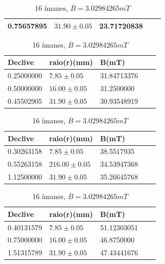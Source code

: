 \documentclass[11pt]{report}
\begin{document}
\begin{table}[!htb]
\begin{minipage}{.5\linewidth}
\begin{tabular}{lllll}
	0.75657895& $31.90\pm 0.05$   & 23.71720838   \\ \hline
				\end{tabular}
		\end{minipage}%
		\vspace{\belowdisplayskip}
		\vspace{\abovedisplayskip}
		\begin{minipage}{.5\linewidth}
			\centering
				\caption{10 ímanes, $\overline{B} = 3.13442077 mT$}
				\begin{tabular}{lllll}
	\hline
	Declive        & raio(r)(mm)            & B(mT)           \\ \hline
	0.25000000 & $7.85\pm 0.05$                 & 31.84713376  \\
	0.50000000 & $16.00\pm 0.05$                & 31.2500000\\
	0.45502905 & $31.90\pm 0.05$  & 30.93548919   \\ \hline
				\end{tabular}
		\end{minipage}
		\vspace{\belowdisplayskip}
		\vspace{\abovedisplayskip}
		\begin{minipage}{.5\linewidth}
			\centering
			\caption{12 ímanes, $\overline{B} = 3.0099368 mT$}
				\begin{tabular}{lllll}
	\hline
	Declive        & raio(r)(mm)     & B(mT)          \\ \hline
	0.30263158 & $7.85\pm 0.05$  &38.5517935  \\
	0.55263158& $216.00\pm 0.05$      &34.53947368 \\
	1.12500000& $31.90\pm 0.05$    &35.26645768   \\ \hline
				\end{tabular}
		\end{minipage}%
		\vspace{\belowdisplayskip}
		\vspace{\abovedisplayskip}
		\begin{minipage}{.5\linewidth}
			\centering
			\caption{16 ímanes, $\overline{B} = 3.02984265 mT$}
				\begin{tabular}{lllll}
	\hline
	Declive        & raio(r)(mm)            & B(mT)           \\ \hline
	0.40131579 &$7.85\pm 0.05$      & 51.12303051  \\
	0.75000000 &$16.00\pm 0.05$   & 46.8750000\\
	1.51315789 &$31.90\pm 0.05$     & 47.43441676   \\ \hline
				\end{tabular}
		\end{minipage}
		\vspace{\belowdisplayskip}
\end{table}
\end{document}
